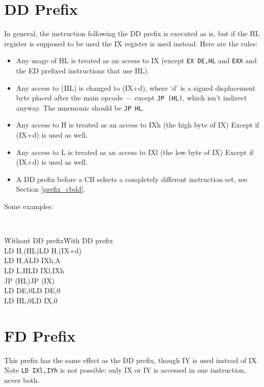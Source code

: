 \documentclass[oneside,a4paper]{book}
\begin{document}
\section{DD Prefix \cite{gerton}}

In general, the instruction following the DD prefix is executed as is, but
if the HL register is supposed to be used the IX register is used instead.
Here are the rules:

\begin{itemize}

\item Any usage of HL is treated as an access to IX (except {\tt EX DE,HL} and 
  {\tt EXX} and the ED prefixed instructions that use HL).
\item Any access to (HL) is changed to (IX+d), where `d' is a signed displacement
  byte placed after the main opcode --- except {\tt JP (HL)}, which isn't indirect
  anyway. The mnemonic should be {\tt JP HL}.
\item Any access to H is treated as an access to IXh (the high byte of IX)
  Except if (IX+d) is used as well.
\item Any access to L is treated as an access to IXl (the low byte of IX)
  Except if (IX+d) is used as well.
\item A DD prefix before a CB selects a completely different instruction 
  set, see Section {\ref{prefix_cbdd}}.\\
\end{itemize}

Some examples:

{\tt 
\begin{tabbing}
{\qquad}\={\rm Without DD prefix}\qquad\={\rm With DD prefix}\+ \\
LD H,(HL)\>LD H,(IX+d)\\
LD H,A\>LD IXh,A\\
LD L,H\>LD IXl,IXh\\
JP (HL)\>JP (IX)\\
LD DE,0\>LD DE,0\\
LD HL,0\>LD IX,0\\
\end{tabbing}
}

\section{FD Prefix \cite{gerton}}

This prefix has the same effect as the DD prefix, though IY is used instead 
of IX.  Note {\tt LD IXl,IYh} is not possible: only IX or IY is accessed in 
one instruction, never both.
\end{document}
